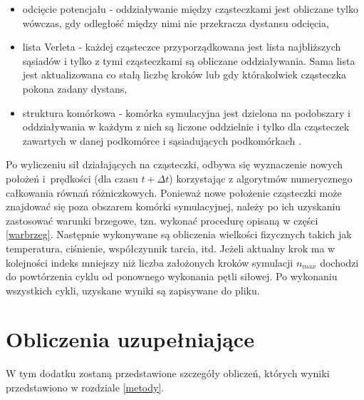 \documentclass[12pt,a4paper,openright]{report} %
\begin{document}
\begin{itemize}
\item{odcięcie potencjału - oddziaływanie między cząsteczkami jest obliczane tylko wówczas, gdy odległość między nimi nie przekracza dystansu odcięcia,}
\item{lista Verleta - każdej cząsteczce przyporządkowana jest lista najbliższych sąsiadów i tylko z tymi cząsteczkami są obliczane oddziaływania. Sama lista jest aktualizowana co stałą liczbę kroków lub gdy którakolwiek cząsteczka pokona zadany dystans, }
\item{struktura komórkowa - komórka symulacyjna jest dzielona na podobszary i oddziaływania w każdym z nich są liczone oddzielnie i tylko dla cząsteczek zawartych w danej podkomórce i sąsiadujących podkomórkach \cite{AllenTildesley}. }
\end{itemize}
Po wyliczeniu sił działających na cząsteczki, odbywa się wyznaczenie nowych położeń i~prędkości (dla czasu $t+\Delta t$) korzystając z algorytmów numerycznego całkowania równań różniczkowych. Ponieważ nowe położenie cząsteczki może znajdować się poza obszarem komórki symulacyjnej, należy po ich uzyskaniu zastosować warunki brzegowe, tzn. wykonać procedurę opisaną w części \ref{warbrzeg}. Następnie wykonywane są obliczenia wielkości fizycznych takich jak temperatura, ciśnienie, współczynnik tarcia, itd. Jeżeli aktualny krok ma w kolejności indeks mniejszy niż liczba założonych kroków symulacji $n_{max}$ dochodzi do powtórzenia cyklu od ponownego wykonania pętli siłowej. Po wykonaniu wszystkich cykli, uzyskane wyniki są zapisywane do pliku.
%
\chapter{Obliczenia uzupełniające}
%
W tym dodatku zostaną przedstawione szczegóły obliczeń, których wyniki przedstawiono w rozdziale \ref{metody}.
\end{document}
